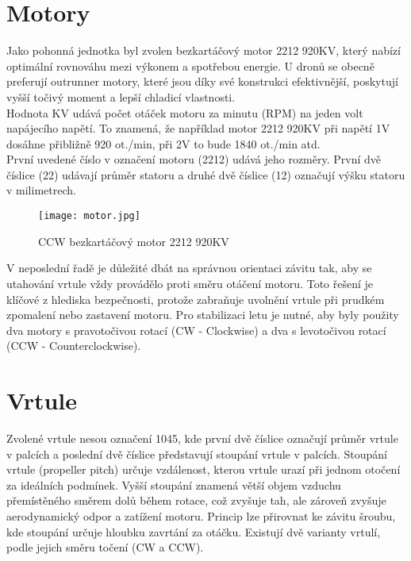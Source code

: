 \documentclass[12pt]{report}
\begin{document}
\section{Motory}
Jako pohonná jednotka byl zvolen bezkartáčový motor 2212 920KV, který nabízí optimální rovnováhu mezi výkonem a spotřebou energie. U dronů se obecně preferují outrunner motory, které jsou díky své konstrukci efektivnější, poskytují vyšší točivý moment a lepší chladicí vlastnosti.\\
Hodnota KV udává počet otáček motoru za minutu (RPM) na jeden volt napájecího napětí. To znamená, že například motor 2212 920KV při napětí 1V dosáhne přibližně 920 ot./min, při 2V to bude 1840 ot./min atd.\\
První uvedené číslo v označení motoru (2212) udává jeho rozměry. První dvě číslice (22) udávají průměr statoru a druhé dvě číslice (12) označují výšku statoru v milimetrech.\\
\begin{figure}[H]
	\centering
	\texttt{[image: motor.jpg]}
	\caption{CCW bezkartáčový motor 2212 920KV}
	\label{fig:motor.jpg}
\end{figure}
V neposlední řadě je důležité dbát na správnou orientaci závitu tak, aby se utahování vrtule vždy provádělo proti směru otáčení motoru. Toto řešení je klíčové z hlediska bezpečnosti, protože zabraňuje uvolnění vrtule při prudkém zpomalení nebo zastavení motoru. Pro stabilizaci letu je nutné, aby byly použity dva motory s pravotočivou rotací (CW - Clockwise) a dva s levotočivou rotací (CCW - Counterclockwise).\\

\section{Vrtule}
Zvolené vrtule nesou označení 1045, kde první dvě číslice označují průměr vrtule v palcích a poslední dvě číslice představují stoupání vrtule v palcích. Stoupání vrtule (propeller pitch) určuje vzdálenost, kterou vrtule urazí při jednom otočení za ideálních podmínek. Vyšší stoupání znamená větší objem vzduchu přemístěného směrem dolů během rotace, což zvyšuje tah, ale zároveň zvyšuje aerodynamický odpor a zatížení motoru. Princip lze přirovnat ke závitu šroubu, kde stoupání určuje hloubku zavrtání za otáčku. Existují dvě varianty vrtulí, podle jejich směru točení (CW a CCW).\\
\end{document}
